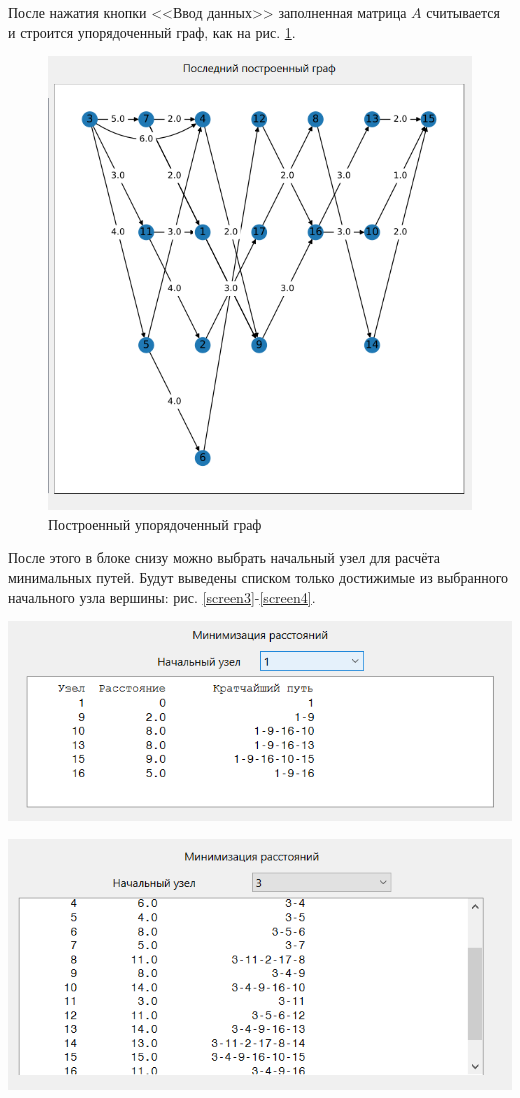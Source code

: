 	После нажатия кнопки <<Ввод данных>> заполненная матрица $A$ считывается и строится упорядоченный граф, как на рис. \ref{screen2}.
	
	\begin{figure}[h]
		\centering\includegraphics[width=.55\textwidth]{png/screen2.png}
		\caption{Построенный упорядоченный граф}
		\label{screen2}
	\end{figure}
	
	После этого в блоке снизу можно выбрать начальный узел для расчёта минимальных путей. Будут выведены списком только достижимые из выбранного начального узла вершины: рис. \ref{screen3}-\ref{screen4}.
	
	\noindent\begin{minipage}{0.45\textwidth}
		\includegraphics[width=\textwidth]{png/screen3.png}
		\label{screen3}
	\end{minipage}
	\begin{minipage}{0.45\textwidth}
		\includegraphics[width=\textwidth]{png/screen4.png}
		\label{screen4}
	\end{minipage}
	
